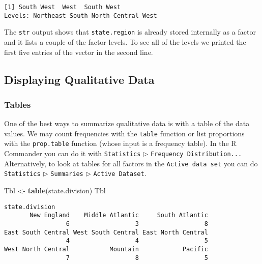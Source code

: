\documentclass[]{book}
\newenvironment{Shaded}{\begin{snugshade}}{\end{snugshade}}
\newcommand{\KeywordTok}[1]{\textcolor[rgb]{0.13,0.29,0.53}{\textbf{{#1}}}}
\newcommand{\StringTok}[1]{\textcolor[rgb]{0.31,0.60,0.02}{{#1}}}
\newcommand{\NormalTok}[1]{{#1}}
\numberwithin{equation}{chapter}
\numberwithin{figure}{chapter}
\theoremstyle{plain}
\theoremstyle{definition}
\theoremstyle{remark}
\theoremstyle{definition}
\theoremstyle{definition}
\theoremstyle{remark}
\begin{document}
\begin{verbatim}
[1] South West  West  South West 
Levels: Northeast South North Central West
\end{verbatim}

The \texttt{str}  output shows that
\texttt{state.region} is already stored internally as a factor and it
lists a couple of the factor levels. To see all of the levels we printed
the first five entries of the vector in the second line.

\subsection{Displaying Qualitative
Data}\label{sub-displaying-qualitative-data}

\subsubsection{Tables}\label{par-tables}

One of the best ways to summarize qualitative data is with a table of
the data values. We may count frequencies with the \texttt{table}
function or list proportions with the \texttt{prop.table}
 function (whose input is a
frequency table). In the R Commander you can do it with
\texttt{Statistics} \(\triangleright\)
\texttt{Frequency\ Distribution...} Alternatively, to look at tables for
all factors in the \texttt{Active\ data\ set}
 you can do
\texttt{Statistics} \(\triangleright\) \texttt{Summaries}
\(\triangleright\) \texttt{Active\ Dataset}.

\begin{Shaded}
\begin{Highlighting}[]
\NormalTok{Tbl <-}\StringTok{ }\KeywordTok{table}\NormalTok{(state.division)}
\NormalTok{Tbl}
\end{Highlighting}
\end{Shaded}

\begin{verbatim}
state.division
       New England    Middle Atlantic     South Atlantic 
                 6                  3                  8 
East South Central West South Central East North Central 
                 4                  4                  5 
West North Central           Mountain            Pacific 
                 7                  8                  5 
\end{verbatim}
\end{document}
